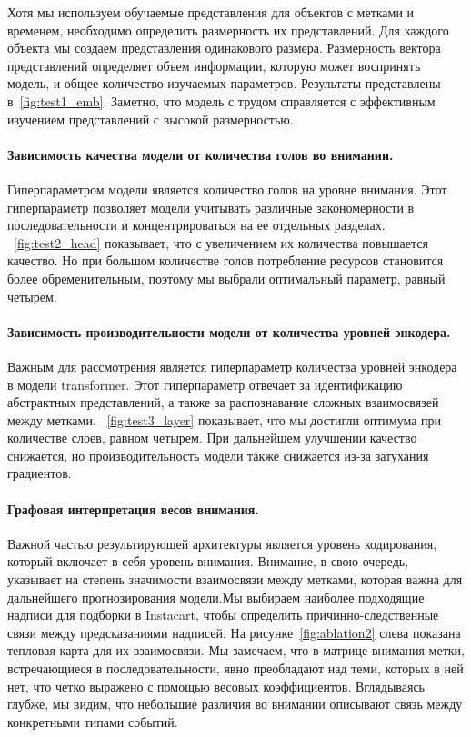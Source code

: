 \documentclass[a4paper, 12pt]{article} %
\begin{document}
Хотя мы используем обучаемые представления для объектов с метками и временем, необходимо определить размерность их представлений. Для каждого объекта мы создаем представления одинакового размера. Размерность вектора представлений определяет объем информации, которую может воспринять модель, и общее количество изучаемых параметров. Результаты представлены в~\ref{fig:test1_emb}. Заметно, что модель с трудом справляется с эффективным изучением представлений с высокой размерностью.

\paragraph{\textbf{Зависимость качества модели от количества голов во внимании.}}

Гиперпараметром модели является количество голов на уровне внимания. Этот гиперпараметр позволяет модели учитывать различные закономерности в последовательности и концентрироваться на ее отдельных разделах. ~\ref{fig:test2_head} показывает, что с увеличением их количества повышается качество. Но при большом количестве голов потребление ресурсов становится более обременительным, поэтому мы выбрали оптимальный параметр, равный четырем.
 
\paragraph{\textbf{Зависимость производительности модели от количества уровней энкодера.}}

Важным для рассмотрения является гиперпараметр количества уровней энкодера в модели transformer. Этот гиперпараметр отвечает за идентификацию абстрактных представлений, а также за распознавание сложных взаимосвязей между метками. ~\ref{fig:test3_layer} показывает, что мы достигли оптимума при количестве слоев, равном четырем. При дальнейшем улучшении качество снижается, но производительность модели также снижается из-за затухания градиентов.

\paragraph{Графовая интерпретация весов внимания.}
Важной частью результирующей архитектуры является уровень кодирования, который включает в себя уровень внимания. Внимание, в свою очередь, указывает на степень значимости взаимосвязи между метками, которая важна для дальнейшего прогнозирования модели.Мы выбираем наиболее подходящие надписи для подборки в Instacart, чтобы определить причинно-следственные связи между предсказаниями надписей. На рисунке~\ref{fig:ablation2} слева показана тепловая карта для их взаимосвязи. Мы замечаем, что в матрице внимания метки, встречающиеся в последовательности, явно преобладают над теми, которых в ней нет, что четко выражено с помощью весовых коэффициентов. Вглядываясь глубже, мы видим, что небольшие различия во внимании описывают связь между конкретными типами событий. 
\end{document}
